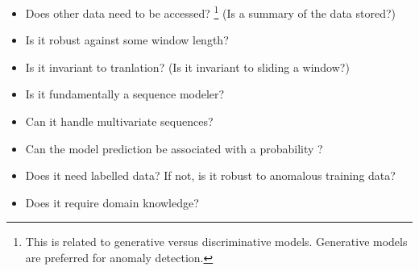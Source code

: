 \begin{itemize}

\item Does other data need to be accessed?%
\footnote{This is related to generative versus discriminative models. Generative models are preferred for anomaly detection.}
(Is a summary of the data stored?)

\item Is it robust against some window length?

\item Is it invariant to tranlation? (Is it invariant to sliding a window?)

\item Is it fundamentally a sequence modeler?

\item Can it handle multivariate sequences?

\item Can the model prediction be associated with a probability \cite{Graves2013b}?

\item Does it need labelled data? If not, is it robust to anomalous training data?

\item Does it require domain knowledge?

\end{itemize}


